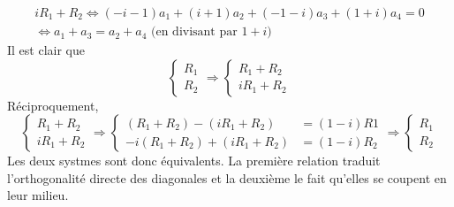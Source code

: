 \begin{enumerate}
\begin{enumerate}
\begin{multline*}
 iR_1 + R_2
\Leftrightarrow
(-i-1)a_1 + (i+1)a_2 + (-1-i)a_3 + (1+i)a_4 = 0 \\
\Leftrightarrow a_1 + a_3 = a_2+a_4 \text{ (en divisant par $1+i$) }
\end{multline*}
Il est clair que
\begin{displaymath}
\left\lbrace 
\begin{aligned}
 R_1 \\ R_2
\end{aligned}
\right. 
\Rightarrow
\left\lbrace 
\begin{aligned}
 R_1 + R_2\\ iR_1 +R_2
\end{aligned}
\right. 
\end{displaymath}
Réciproquement,
\begin{displaymath}
\left\lbrace 
\begin{aligned}
 R_1 + R_2\\ iR_1 +R_2
\end{aligned}
\right. 
\Rightarrow
\left\lbrace 
\begin{aligned}
 (R_1 + R_2) -(iR_1 +R_2)&= (1-i)R1\\ -i(R_1 + R_2) +(iR_1 +R_2) &= (1-i)R_2
\end{aligned}
\right. 
\Rightarrow
\left\lbrace 
\begin{aligned}
 R_1 \\ R_2
\end{aligned}
\right. 
\end{displaymath}
Les deux systmes sont donc équivalents.\newline
La première relation traduit l'orthogonalité directe des diagonales et la deuxième le fait qu'elles se coupent en leur milieu.
\end{enumerate}
\end{enumerate}

